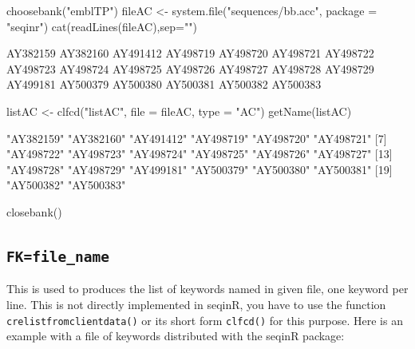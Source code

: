 \documentclass{article}
\begin{document}
\begin{Schunk}
\begin{Sinput}
 choosebank("emblTP")
 fileAC <- system.file("sequences/bb.acc", package = "seqinr")
 cat(readLines(fileAC),sep="\n")
\end{Sinput}
\begin{Soutput}
AY382159
AY382160
AY491412
AY498719
AY498720
AY498721
AY498722
AY498723
AY498724
AY498725
AY498726
AY498727
AY498728
AY498729
AY499181
AY500379
AY500380
AY500381
AY500382
AY500383
\end{Soutput}
\begin{Sinput}
 listAC <- clfcd("listAC", file = fileAC, type = "AC")
 getName(listAC)
\end{Sinput}
\begin{Soutput}
 [1] "AY382159" "AY382160" "AY491412" "AY498719" "AY498720" "AY498721"
 [7] "AY498722" "AY498723" "AY498724" "AY498725" "AY498726" "AY498727"
[13] "AY498728" "AY498729" "AY499181" "AY500379" "AY500380" "AY500381"
[19] "AY500382" "AY500383"
\end{Soutput}
\begin{Sinput}
 closebank()
\end{Sinput}
\end{Schunk}


\subsection{\texttt{FK=file\_name}}

This is used to produces the list of keywords named in given file, one keyword per line.
This is not directly implemented in seqinR, you have to use the function
\texttt{crelistfromclientdata()} or its short form \texttt{clfcd()} for this purpose. Here is an example with
a file of keywords distributed with the seqinR package:
\end{document}
